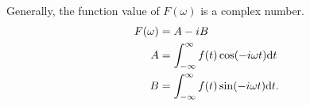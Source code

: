 Generally, the function value of $F(\omega)$ is a complex number.
\begin{equation*}
    \begin{aligned}
        F(\omega) &= A - iB \\
        A &= \int_{-\infty}^{\infty} f(t) \cos(-i\omega t) \differential t \\
        B &= \int_{-\infty}^{\infty} f(t) \sin(-i\omega t) \differential t.
    \end{aligned}
\end{equation*}
